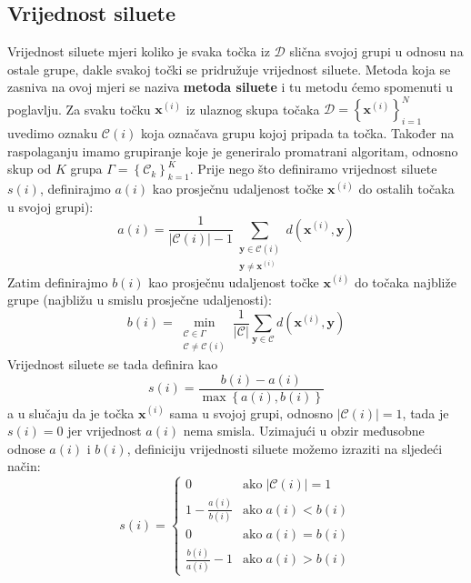 \documentclass[times, utf8, zavrsni]{fer}
\begin{document}
\subsection{Vrijednost siluete}
Vrijednost siluete  mjeri koliko je svaka točka iz $\mathcal{D}$ slična svojoj grupi u odnosu na ostale grupe, dakle svakoj točki se pridružuje vrijednost siluete. Metoda koja se zasniva na ovoj mjeri se naziva \textbf{metoda siluete} i tu metodu ćemo spomenuti u poglavlju. Za svaku točku $\mathbf{x}^{(i)}$ iz ulaznog skupa točaka $\mathcal{D} = \left\{\mathbf{x}^{(i)}\right\}_{i=1}^{N}$ uvedimo oznaku $\mathcal{C} \left(i\right)$ koja označava grupu kojoj pripada ta točka. Također na raspolaganju imamo grupiranje koje je generiralo promatrani algoritam, odnosno skup od $K$ grupa $\Gamma = \left\{\mathcal{C}_k\right\}_{k=1}^{K}$.
Prije nego što definiramo vrijednost siluete $s (i)$, definirajmo $a (i)$ kao prosječnu udaljenost točke $\mathbf{x}^{(i)}$ do ostalih točaka u svojoj grupi):
\[a (i) = \frac{1}{\left\vert \mathcal{C} \left(i\right) \right\vert - 1} \sum_{\substack{\mathbf{y} \in \mathcal{C} \left(i\right) \\ \mathbf{y} \neq \mathbf{x}^{(i)}}} d \left(\mathbf{x}^{(i)}, \mathbf{y}\right)
\]
Zatim definirajmo $b (i)$ kao prosječnu udaljenost točke $\mathbf{x}^{(i)}$ do točaka najbliže grupe (najbližu u smislu prosječne udaljenosti):
\[b (i) = \min_{\substack{\mathcal{C} \in \Gamma \\ \mathcal{C} \neq \mathcal{C} \left(i\right)}} \frac{1}{\vert \mathcal{C} \vert} \sum_{\mathbf{y} \in \mathcal{C}}
d \left(\mathbf{x}^{(i)}, \mathbf{y}\right)\]
Vrijednost siluete se tada definira kao
\[s (i) = \frac{b (i) - a (i)}{\operatorname{max} \left\{a (i), b (i)\right\}}\]
a u slučaju da je točka $\mathbf{x}^{(i)}$ sama u svojoj grupi, odnosno $\left\vert \mathcal{C} \left(i\right) \right\vert = 1$, tada je $s (i) = 0$ jer vrijednost $a (i)$ nema smisla. Uzimajući u obzir međusobne odnose $a (i)$ i $b (i)$, definiciju vrijednosti siluete možemo izraziti na sljedeći način:
\[
s (i) = \begin{cases}
 0 & \text{ako} \; \left\vert \mathcal{C} \left(i\right) \right\vert = 1 \\
 1 - \frac{a (i)}{b (i)} & \text{ako} \; a (i) < b (i) \\  
 0 & \text{ako} \; a (i) = b (i) \\  
 \frac{b (i)}{a (i)} - 1 & \text{ako} \; a (i) > b(i)  
 \end{cases}
\]
\end{document}
